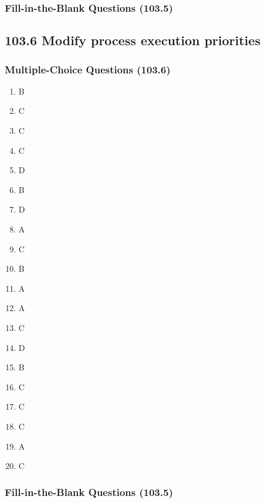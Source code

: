 \documentclass[a4paper]{report}
\begin{document}
\subsubsection*{Fill-in-the-Blank Questions (103.5)}

\subsection*{103.6 Modify process execution priorities}
\subsubsection*{Multiple-Choice Questions (103.6)}
\begin{enumerate}[1.]
    \item B
    \item C
    \item C
    \item C
    \item D
    \item B
    \item D
    \item A
    \item C
    \item B
    \item A
    \item A
    \item C
    \item D
    \item B
    \item C
    \item C
    \item C
    \item A
    \item C
\end{enumerate}



\subsubsection*{Fill-in-the-Blank Questions (103.5)}

\end{document}
